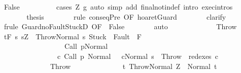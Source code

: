 \begin{isabellebody}
\ False\isanewline
\ \ \ \ \ \ \ \ \isamarkupfalse%
\ {\isacharparenleft}cases\ {\isachardoublequoteopen}Z{\isasymin}\ g{\isachardoublequoteclose}{\isacharparenright}\ {\isacharparenleft}auto\ simp\ add{\isacharcolon}\ final{\isacharunderscore}notin{\isacharunderscore}def\ intro{\isacharcolon}\ exec{\isachardot}intros\ {\isacharparenright}\isanewline
\ \ \ \ \isamarkupfalse%
\isanewline
\ \ \ \ \isamarkupfalse%
\ \isamarkupfalse%
\ {\isacharquery}thesis\isanewline
\ \ \ \ \ \ \isamarkupfalse%
\ {\isacharparenleft}rule\ conseqPre\ {\isacharbrackleft}OF\ hoaret{\isachardot}Guard{\isacharbrackright}{\isacharparenright}\isanewline
\ \ \ \ \ \ \isamarkupfalse%
\ clarify\isanewline
\ \ \ \ \ \ \isamarkupfalse%
\ {\isacharparenleft}frule\ Guard{\isacharunderscore}noFaultStuckD\ {\isacharbrackleft}OF\ {\isacharunderscore}\ False{\isacharbrackright}{\isacharparenright}\isanewline
\ \ \ \ \ \ \isamarkupfalse%
\ auto\isanewline
\ \ \ \ \ \ \isamarkupfalse%
\isanewline
\ \ \isamarkupfalse%
\isanewline
{}\isamarkupfalse%
\isanewline
\ \ \isamarkupfalse%
\ Throw\isanewline
\ \ \isamarkupfalse%
\ {\isachardoublequoteopen}{\isasymGamma}{\isacharcomma}{\isasymTheta}{\isasymturnstile}\isactrlsub t\isactrlbsub {\isacharslash}F\isactrlesub \ {\isacharbraceleft}s{\isachardot}\ s{\isacharequal}Z\ {\isasymand}\ {\isasymGamma}{\isasymturnstile}{\isasymlangle}Throw{\isacharcomma}Normal\ s{\isasymrangle}\ {\isasymRightarrow}{\isasymnotin}{\isacharparenleft}{\isacharbraceleft}Stuck{\isacharbraceright}\ {\isasymunion}\ Fault\ {\isacharbackquote}\ {\isacharparenleft}{\isacharminus}F{\isacharparenright}{\isacharparenright}\ {\isasymand}\ \isanewline
\ \ \ \ \ \ \ \ \ \ \ \ \ \ \ \ \ \ {\isasymGamma}{\isasymturnstile}Call\ p{\isasymdown}Normal\ {\isasymsigma}\ {\isasymand}\isanewline
\ \ \ \ \ \ \ \ \ \ \ \ \ \ \ \ {\isacharparenleft}{\isasymexists}c{\isacharprime}{\isachardot}\ {\isasymGamma}{\isasymturnstile}{\isacharparenleft}Call\ p{\isacharcomma}\ Normal\ {\isasymsigma}{\isacharparenright}\ {\isasymrightarrow}\isactrlsup {\isacharplus}\ {\isacharparenleft}c{\isacharprime}{\isacharcomma}Normal\ s{\isacharparenright}\ {\isasymand}\ Throw\ {\isasymin}\ redexes\ c{\isacharprime}{\isacharparenright}{\isacharbraceright}\isanewline
\ \ \ \ \ \ \ \ \ \ \ \ \ \ Throw\isanewline
\ \ \ \ \ \ \ \ \ \ \ \ \ \ {\isacharbraceleft}t{\isachardot}\ {\isasymGamma}{\isasymturnstile}{\isasymlangle}Throw{\isacharcomma}Normal\ Z{\isasymrangle}\ {\isasymRightarrow}\ Normal\ t{\isacharbraceright}{\isacharcomma}\isanewline

\end{isabellebody}
